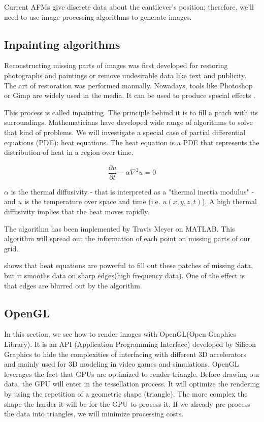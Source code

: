 Current AFMs give discrete data about the cantilever's position; therefore, we'll need to use image processing algorithms to generate images. 

\subsection{Inpainting algorithms}

Reconstructing missing parts of images was first developed for restoring photographs and paintings or remove undesirable data like text and publicity. The art of restoration was performed manually. Nowadays, tools like Photoshop or Gimp are widely used in the media. It can be used to produce special effects 
\cite{richard2001fast}.

This process is called inpainting. The principle behind it is to fill a patch with its surroundings. Mathematicians have developed wide range of algorithms to solve that kind of problems. We will investigate a special case of partial differential equations (PDE): heat equations. 
The heat equation is a PDE that represents the distribution of heat in a region over time. 

\begin{equation}\label{eqn:heateq}
\frac{\partial u}{\partial t} - \alpha \nabla^2 u = 0
\end{equation}


$\alpha$ is the thermal diffusivity - that is interpreted as a "thermal inertia modulus" - and $u$ is the temperature over space and time (i.e. $u(x,y,z,t)$). A high thermal diffusivity implies that the heat moves rapidly.

The algorithm has been implemented by Travis Meyer on MATLAB. This algorithm will spread out the information of each point on missing parts of our grid.

\cite{aubert2006mathematical} shows that heat equations are powerful to fill out these patches of missing data, but it smooths data on sharp edges(high frequency data). One of the effect is that edges are blurred out by the algorithm.


\subsection{OpenGL}

In this section, we see how to render images with OpenGL(Open Graphics Library). It is an API (Application Programming Interface) developed by Silicon Graphics to hide the complexities of interfacing with different 3D accelerators and mainly used for 3D modeling in video games and simulations. OpenGL leverages the fact that GPUs are optimized to render triangle. Before drawing our data, the GPU will enter in the tessellation process. It will optimize the rendering by using the repetition of a geometric shape (triangle). The more complex the shape the harder it will be for the GPU to process it. If we already pre-process the data into triangles,  we will minimize processing costs. \cite{abobegpu}

